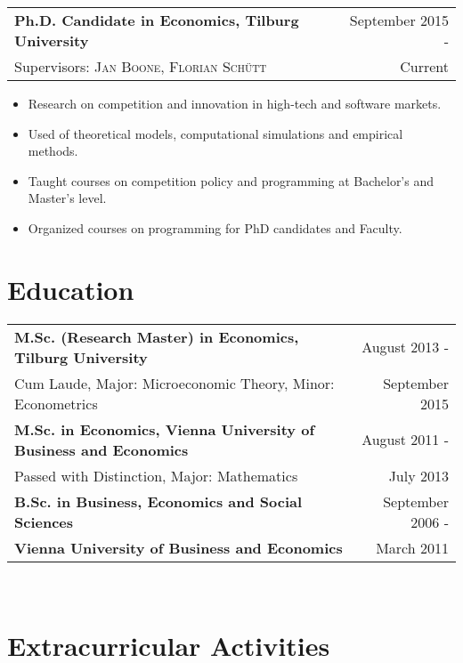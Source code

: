 \documentclass[a4paper,8pt]{article}
\begin{document}
\begin{tabular}{p{15cm} r}
	\textbf{Ph.D. Candidate in Economics, Tilburg University} &September 2015 -\\
	\small Supervisors:  \textsc{Jan Boone},  \textsc{Florian Schütt} & Current\phantom{ -}\\
\end{tabular}\vspace{-0.5em}
\begin{itemize}[noitemsep]
	\item Research on competition and innovation in high-tech and software markets.
	\item Used of theoretical models, computational simulations and empirical methods.
	\item Taught courses on competition policy and programming at Bachelor's and Master's level.
	\item Organized courses on programming for PhD candidates and Faculty.
\end{itemize}

\section{Education}

\begin{tabular}{p{15cm} r}
	\textbf{M.Sc. (Research Master) in Economics, Tilburg University}&  August 2013 -\\
	Cum Laude, Major: Microeconomic Theory, Minor: Econometrics& September 2015\hphantom{-}
	\vspace{0.5em}\\		
	\textbf{M.Sc. in Economics, Vienna University of Business and Economics}& August 2011 -\\
	Passed with Distinction, Major: Mathematics & July 2013\phantom{-}
	\vspace{0.5em}\\ 
	\textbf{B.Sc. in Business, Economics and Social Sciences}& September 2006 -\\ 
	\textbf{Vienna University of Business and Economics}& March 2011\phantom{- }\\
\end{tabular}\\

\section{Extracurricular Activities }
\end{document}
